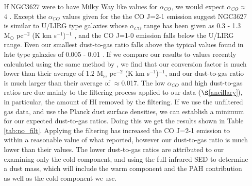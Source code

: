 If NGC3627 were to have Milky Way like values for $\alpha_{CO}$, we would expect $\alpha_{CO}\approx$4 \citep{sandstrom2013}.  Except the $\alpha_{CO}$ values given for the the CO J=2-1 emission suggest  NGC3627 is similar to U/LIRG type galaxies whose $\alpha_{CO}$ range has been given as 0.3 - 1.3 M$_\odot$ pc$^{-2}$ (K km s$^{-1}$)$^{-1}$ \citep{downes1998}, and the CO J=1-0 emission falls below the U/LIRG range.  Even our smallest dust-to-gas ratio falls above the typical values found in late type galaxies of 0.005 - 0.01 \citep{smith2012}.  If we compare our results to values recently calculated using the same method by \cite{sandstrom2013}, we find that our conversion factor is much lower than their average of 1.2 M$_\odot$ pc$^{-2}$ (K km s$^{-1}$)$^{-1}$, and our dust-to-gas ratio is much larger than their average of $\approx$0.017.  The low $\alpha_{CO}$ and high dust-to-gas ratios are due mainly to the filtering process applied to our data ($\S$\ref{ancillary}), in particular, the amount of HI removed by the filtering.  If we use the unfiltered gas data, and use the Planck dust surface densities, we can establish a minimum for our expected dust-to-gas ratios.  Doing this we get the results shown in Table \ref{tab:no_filt}.  Applying the filtering has increased the CO J=2-1 emission to within a reasonable value of what \cite{sandstrom2013} reported, however our dust-to-gas ratio is much lower than their values.  The lower dust-to-gas ratios are attributed to our examining only the cold component, and \cite{sandstrom2013} using the full infrared SED to determine a dust mass, which will include the warm component and the PAH contribution as well as the cold component we use.

